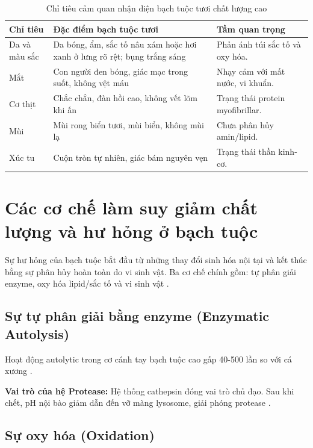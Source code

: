 \documentclass[12pt,a4paper]{report}
\begin{document}
\begin{table}[H]
\centering
\caption{Chỉ tiêu cảm quan nhận diện bạch tuộc tươi chất lượng cao}
\begin{tabular}{p{3cm} p{6cm} p{5.5cm}}
\toprule
\textbf{Chỉ tiêu} & \textbf{Đặc điểm bạch tuộc tươi} & \textbf{Tầm quan trọng} \\
\midrule
Da và màu sắc & Da bóng, ẩm, sắc tố nâu xám hoặc hơi xanh ở lưng rõ rệt; bụng trắng sáng \cite{happyfood_tips} & Phản ánh túi sắc tố và oxy hóa. \\
Mắt & Con người đen bóng, giác mạc trong suốt, không vệt máu \cite{pubmed_ice_storage} & Nhạy cảm với mất nước, vi khuẩn. \\
Cơ thịt & Chắc chắn, đàn hồi cao, không vết lõm khi ấn \cite{fptshop_so_che} & Trạng thái protein myofibrillar. \\
Mùi & Mùi rong biển tươi, mùi biển, không mùi lạ \cite{pubmed_ice_storage} & Chưa phân hủy amin/lipid. \\
Xúc tu & Cuộn tròn tự nhiên, giác bám nguyên vẹn \cite{pubmed_ice_storage} & Trạng thái thần kinh-cơ. \\
\bottomrule
\end{tabular}
\end{table}

\section{Các cơ chế làm suy giảm chất lượng và hư hỏng ở bạch tuộc}

Sự hư hỏng của bạch tuộc bắt đầu từ những thay đổi sinh hóa nội tại và kết thúc bằng sự phân hủy hoàn toàn do vi sinh vật. Ba cơ chế chính gồm: tự phân giải enzyme, oxy hóa lipid/sắc tố và vi sinh vật \cite{mdpi_fish_spoilage}.

\subsection{Sự tự phân giải bằng enzyme (Enzymatic Autolysis)}

Hoạt động autolytic trong cơ cánh tay bạch tuộc cao gấp 40-500 lần so với cá xương \cite{researchgate_proteolytic}.

\textbf{Vai trò của hệ Protease:} Hệ thống cathepsin đóng vai trò chủ đạo. Sau khi chết, pH nội bào giảm dẫn đến vỡ màng lysosome, giải phóng protease \cite{agri_inst_ph}.

\subsection{Sự oxy hóa (Oxidation)}
\end{document}
